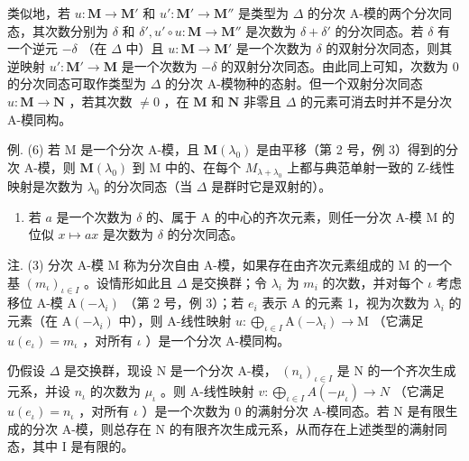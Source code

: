 类似地，若 \(u: \mathbf{M} \to \mathbf{M}'\) 和 \(u': \mathbf{M}' \to \mathbf{M}''\) 是类型为 \(\Delta\) 的分次 A-模的两个分次同态，其次数分别为 \(\delta\) 和 \(\delta', u' \circ u: \mathbf{M} \to \mathbf{M}''\) 是次数为 \(\delta + \delta'\) 的分次同态。若 \(\delta\) 有一个逆元 \(-\delta\) （在 \(\Delta\) 中）且 \(u: \mathbf{M} \to \mathbf{M}'\) 是一个次数为 \(\delta\) 的双射分次同态，则其逆映射 \(u': \mathbf{M}' \to \mathbf{M}\) 是一个次数为 \(-\delta\) 的双射分次同态。由此同上可知，次数为 0 的分次同态可取作类型为 \(\Delta\) 的分次 A-模物种的态射。但一个双射分次同态 \(u: \mathbf{M} \to \mathbf{N}\) ，若其次数 \(\neq 0\) ，在 \(\mathbf{M}\) 和 \(\mathbf{N}\) 非零且 \(\Delta\) 的元素可消去时并不是分次 A-模同构。

例. (6) 若 M 是一个分次 A-模，且 \(\mathbf{M}(\lambda_{0})\) 是由平移（第 2 号，例 3）得到的分次 A-模，则 \(\mathbf{M}(\lambda_{0})\) 到 M 中的、在每个 \(M_{\lambda+\lambda_{0}}\) 上都与典范单射一致的 Z-线性映射是次数为 \(\lambda_{0}\) 的分次同态（当 \(\Delta\) 是群时它是双射的）。

\begin{enumerate}
\def\labelenumi{(\arabic{enumi})}
\setcounter{enumi}{6}
\tightlist
\item
  若 \(a\) 是一个次数为 \(\delta\) 的、属于 A 的中心的齐次元素，则任一分次 A-模 M 的位似 \(x \mapsto ax\) 是次数为 \(\delta\) 的分次同态。
\end{enumerate}

注. (3) 分次 A-模 M 称为分次自由 A-模，如果存在由齐次元素组成的 M 的一个基 \((m_{\iota})_{\iota \in I}\) 。设情形如此且 \(\Delta\) 是交换群；令 \(\lambda_{i}\) 为 \(m_{i}\) 的次数，并对每个 \(\iota\) 考虑移位 A-模 \(\mathrm{A}(-\lambda_{i})\) （第 2 号，例 3）；若 \(e_{i}\) 表示 A 的元素 1，视为次数为 \(\lambda_{i}\) 的元素（在 \(\mathrm{A}(-\lambda_{i})\) 中），则 A-线性映射 \(u: \bigoplus_{\iota \in I} \mathrm{A}(-\lambda_{i}) \to \mathrm{M}\) （它满足 \(u(e_{\iota}) = m_{\iota}\) ，对所有 \(\iota\) ）是一个分次 A-模同构。

仍假设 \(\Delta\) 是交换群，现设 N 是一个分次 A-模， \((n_{\iota})_{\iota \in I}\) 是 N 的一个齐次生成元系，并设 \(n_{\iota}\) 的次数为 \(\mu_{\iota}\) 。则 A-线性映射 \(v: \bigoplus_{\iota \in I} A(-\mu_{\iota}) \to N\) （它满足 \(u(e_{\iota}) = n_{\iota}\) ，对所有 \(\iota\) ）是一个次数为 0 的满射分次 A-模同态。若 N 是有限生成的分次 A-模，则总存在 N 的有限齐次生成元系，从而存在上述类型的满射同态，其中 I 是有限的。

